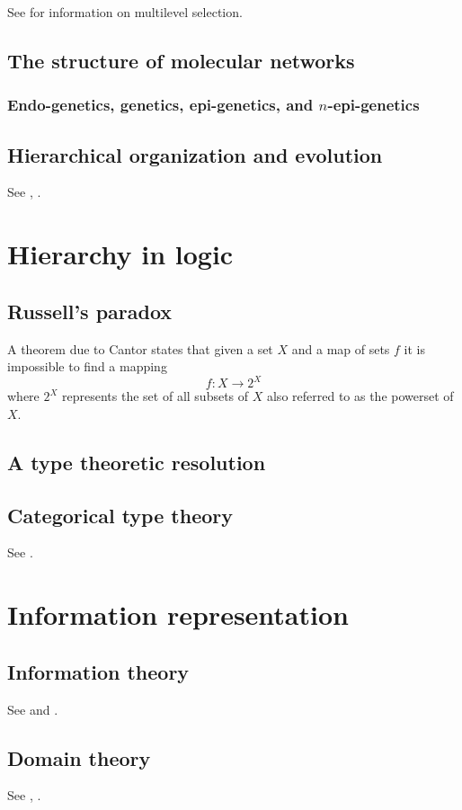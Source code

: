\documentclass[aps,twocolumn]{revtex4}
\begin{document}
See \cite{Okasha2006} for information on multilevel selection.

\subsection{The structure of molecular networks}
\subsubsection{Endo-genetics, genetics, epi-genetics, and $n$-epi-genetics}
\subsection{Hierarchical organization and evolution}
See \cite{Gould1994}, \cite{Arnold1982}.

\section{Hierarchy in logic}

\subsection{Russell's paradox}
A theorem due to Cantor states that given a set $X$ and a map of sets $f$ it is impossible to find a mapping $$ f: X \rightarrow 2^X $$ where $2^X$ represents the set of all subsets of $X$ also referred to as the powerset of $X$.

\subsection{A type theoretic resolution}

\subsection{Categorical type theory}
See \cite{Crole1994a}.

\section{Information representation}

\subsection{Information theory}
See \cite{Ellerman2008} and \cite{Cover2006}.

\subsection{Domain theory}
See \cite{Abramsky}, \cite{Abramsky1995}.
\end{document}
